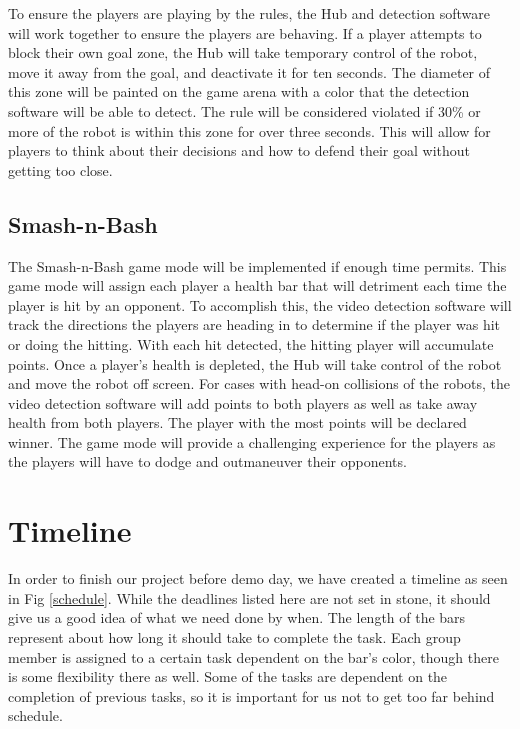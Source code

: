 \documentclass[11pt]{ieeeconf}
\begin{document}
To ensure the players are playing by the rules, the Hub and detection software will work together to ensure the players are behaving. If a player attempts to block their own goal zone, the Hub will take temporary control of the robot, move it away from the goal, and deactivate it for ten seconds. The diameter of this zone will be painted on the game arena with a color that the detection software will be able to detect. The rule will be considered violated if 30\% or more of the robot is within this zone for over three seconds. This will allow for players to think about their decisions and how to defend their goal without getting too close. 

\subsection{Smash-n-Bash}

The Smash-n-Bash game mode will be implemented if enough time permits. This game mode will assign each player a health bar that will detriment each time the player is hit by an opponent. To accomplish this, the video detection software will track the directions the players are heading in to determine if the player was hit or doing the hitting. With each hit detected, the hitting player will accumulate points. Once a player's health is depleted, the Hub will take control of the robot and move the robot off screen. For cases with head-on collisions of the robots, the video detection software will add points to both players as well as take away health from both players. The player with the most points will be declared winner. The game mode will provide a challenging experience for the players as the players will have to dodge and outmaneuver their opponents. 

\section{Timeline}
In order to finish our project before demo day, we have created a timeline as seen in Fig \ref{schedule}. While the deadlines listed here are not set in stone, it should give us a good idea of what we need done by when. The length of the bars represent about how long it should take to complete the task. Each group member is assigned to a certain task dependent on the bar's color, though there is some flexibility there as well. Some of the tasks are dependent on the completion of previous tasks, so it is important for us not to get too far behind schedule.
\end{document}
